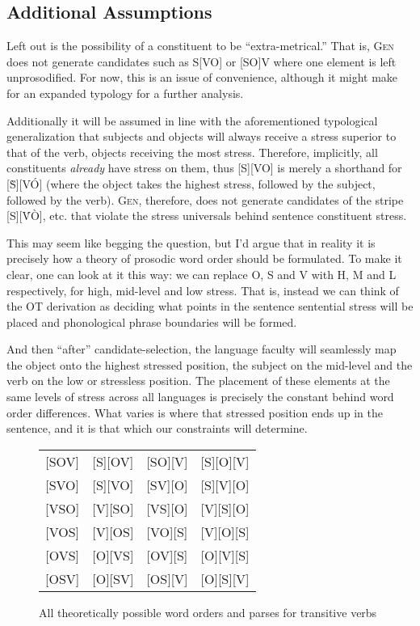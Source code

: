 \documentclass{article}
\begin{document}
\subsection{Additional Assumptions\label{assump}}

Left out is the possibility of a constituent to be ``extra-metrical.''
That is, \textsc{Gen} does not generate candidates such as S[VO] or [SO]V where one element is left unprosodified.
For now, this is an issue of convenience, although it might make for an expanded typology for a further analysis.

Additionally it will be assumed in line with the aforementioned typological generalization that subjects and objects will always receive a stress superior to that of the verb, objects receiving the most stress.
Therefore, implicitly, all constituents \emph{already} have stress on them, thus [S][VO] is merely a shorthand for [{\`S}][V\'O] (where the object takes the highest stress, followed by the subject, followed by the verb).
\textsc{Gen}, therefore, does not generate candidates of the stripe [S][\'V\`O], etc. that violate the stress universals behind sentence constituent stress.

This may seem like begging the question, but I'd argue that in reality it is precisely how a theory of prosodic word order should be formulated.
To make it clear, one can look at it this way: we can replace O, S and V with H, M and L respectively, for high, mid-level and low stress.
That is, instead we can think of the OT derivation as deciding what points in the sentence sentential stress will be placed and phonological phrase boundaries will be formed.

And then ``after'' candidate-selection, the language faculty will seamlessly map the object onto the highest stressed position, the subject on the mid-level and the verb on the low or stressless position.
The placement of these elements at the same levels of stress across all languages is precisely the constant behind word order differences.
What varies is where that stressed position ends up in the sentence, and it is that which our constraints will determine.

\begin{figure}
	\begin{center}
	\begin{tabular}{cccc}
		{}[SOV]&[S][OV]&[SO][V]&[S][O][V]\\
		{}[SVO]&[S][VO]&[SV][O]&[S][V][O]\\
		{}[VSO]&[V][SO]&[VS][O]&[V][S][O]\\
		{}[VOS]&[V][OS]&[VO][S]&[V][O][S]\\
		{}[OVS]&[O][VS]&[OV][S]&[O][V][S]\\
		{}[OSV]&[O][SV]&[OS][V]&[O][S][V]\\
	\end{tabular}
	\end{center}
	\caption{All theoretically possible word orders and parses for transitive verbs\label{allcand}}
\end{figure}
\end{document}
